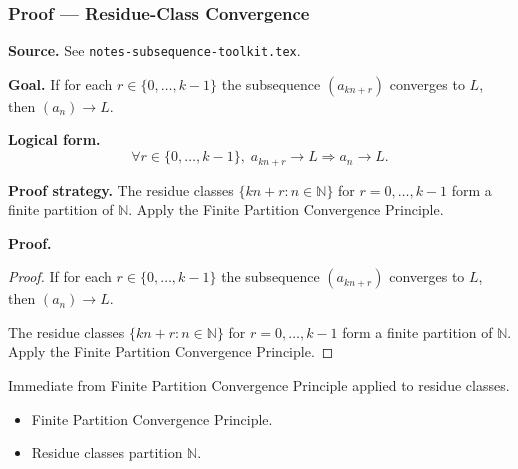 
\clearpage
{}
\hypertarget{proof-RA-ABB-C-residue-class-conv}{}

\subsubsection[Residue-Class Convergence]{Proof --- Residue-Class Convergence}

\bigskip

\noindent
\textbf{Source.}
See \texttt{notes-subsequence-toolkit.tex}.

\vspace{0.75em}

\noindent
\textbf{Goal.}
If for each $r \in \{0,\ldots,k-1\}$ the subsequence $(a_{kn+r})$ converges to $L$, then $(a_n) \to L$.

\vspace{0.75em}

\noindent
\textbf{Logical form.}
\[
  \forall r \in \{0,\ldots,k-1\},\; a_{kn+r} \to L \Rightarrow a_n \to L.
\]

\vspace{0.75em}

\noindent
\textbf{Proof strategy.}
The residue classes $\{kn+r : n \in \mathbb{N}\}$ for $r = 0,\ldots,k-1$ form a finite partition of $\mathbb{N}$. Apply the Finite Partition Convergence Principle.

\vspace{0.75em}

\noindent
\textbf{Proof.}
\begin{proof}
\Claim If for each $r \in \{0,\ldots,k-1\}$ the subsequence $(a_{kn+r})$ converges to $L$, then $(a_n) \to L$.

\Given 

\Goal 

\Strategy The residue classes $\{kn+r : n \in \mathbb{N}\}$ for $r = 0,\ldots,k-1$ form a finite partition of $\mathbb{N}$. Apply the Finite Partition Convergence Principle.

\medskip


\end{proof}

\begin{remark*}
Immediate from Finite Partition Convergence Principle applied to residue classes.
\end{remark*}

\begin{remark*}[Dependencies]
\begin{itemize}
  \item Finite Partition Convergence Principle.
  \item Residue classes partition $\mathbb{N}$.
\end{itemize}
\end{remark*}
